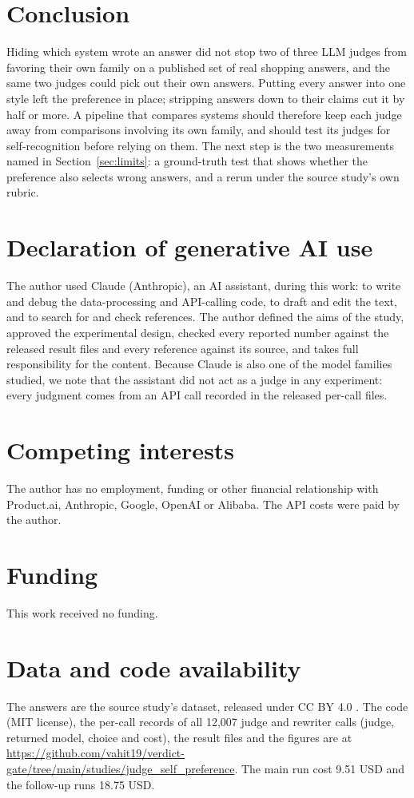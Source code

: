 \documentclass{article}
\begin{document}
\section{Conclusion}
\label{sec:conclusion}

Hiding which system wrote an answer did not stop two of three LLM judges from favoring their own family on a published set of real shopping answers, and the same two judges could pick out their own answers. Putting every answer into one style left the preference in place; stripping answers down to their claims cut it by half or more. A pipeline that compares systems should therefore keep each judge away from comparisons involving its own family, and should test its judges for self-recognition before relying on them. The next step is the two measurements named in Section~\ref{sec:limits}: a ground-truth test that shows whether the preference also selects wrong answers, and a rerun under the source study's own rubric.

\section*{Declaration of generative AI use}
The author used Claude (Anthropic), an AI assistant, during this work: to write and debug the data-processing and API-calling code, to draft and edit the text, and to search for and check references. The author defined the aims of the study, approved the experimental design, checked every reported number against the released result files and every reference against its source, and takes full responsibility for the content. Because Claude is also one of the model families studied, we note that the assistant did not act as a judge in any experiment: every judgment comes from an API call recorded in the released per-call files.

\section*{Competing interests}
The author has no employment, funding or other financial relationship with Product.ai, Anthropic, Google, OpenAI or Alibaba. The API costs were paid by the author.

\section*{Funding}
This work received no funding.

\section*{Data and code availability}
The answers are the source study's dataset, released under CC BY 4.0 \citep{productai2026divergence}. The code (MIT license), the per-call records of all 12,007 judge and rewriter calls (judge, returned model, choice and cost), the result files and the figures are at \url{https://github.com/vahit19/verdict-gate/tree/main/studies/judge_self_preference}. The main run cost 9.51 USD and the follow-up runs 18.75 USD.
\end{document}
